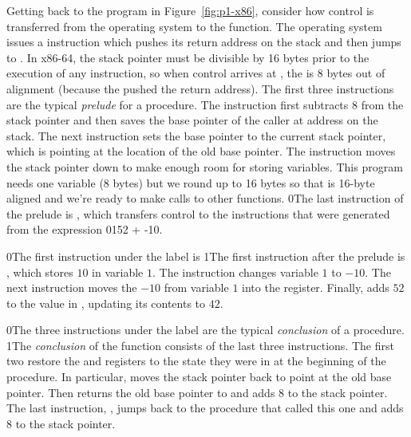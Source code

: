 \documentclass[7x10]{TimesAPriori_MIT}%
\def\racketEd{0}
\def\pythonEd{1}
\def\edition{1}
\newcommand{\racket}[1]{{\if\edition\racketEd{#1}\fi}}
\newcommand{\python}[1]{{\if\edition\pythonEd #1\fi}}
\begin{document}
Getting back to the program in Figure~\ref{fig:p1-x86}, consider how
control is transferred from the operating system to the 
function.  The operating system issues a  instruction
which pushes its return address on the stack and then jumps to
. In x86-64, the stack pointer  must be divisible
by 16 bytes prior to the execution of any  instruction, so
when control arrives at , the  is 8 bytes out of
alignment (because the  pushed the return address).  The
first three instructions are the typical \emph{prelude}
for a procedure.  The instruction  first subtracts $8$ from the stack
pointer and then saves the base pointer of the caller at address
 on the stack. The next instruction  sets the
base pointer to the current stack pointer, which is pointing at the location
of the old base pointer. The instruction  moves the stack
pointer down to make enough room for storing variables.  This program
needs one variable ($8$ bytes) but we round up to 16 bytes so that
 is 16-byte aligned and we're ready to make calls to other
functions.
\racket{The last instruction of the prelude is ,
which transfers control to the instructions that were generated from
the expression \racket{\code{(+ 52 (- 10))}}\python{52 + -10}.}

\racket{The first instruction under the  label is}
%
\python{The first instruction after the prelude is}
%
, which stores $10$ in variable $1$.
%
The instruction  changes variable $1$ to $-10$.
%
The next instruction moves the $-10$ from variable $1$ into the
 register.  Finally,  adds $52$ to
the value in , updating its contents to $42$.

\racket{The three instructions under the label  are the
  typical \emph{conclusion} of a procedure.}
%
\python{The \emph{conclusion}\index{subject}{conclusion} of the
  \code{main} function consists of the last three instructions.}
%
The first two restore the  and  registers to the
state they were in at the beginning of the procedure. In particular,
 moves the stack pointer back to point at the
old base pointer. Then  returns the old base pointer
to  and adds $8$ to the stack pointer.  The last instruction,
, jumps back to the procedure that called this one and adds
$8$ to the stack pointer.
\end{document}
